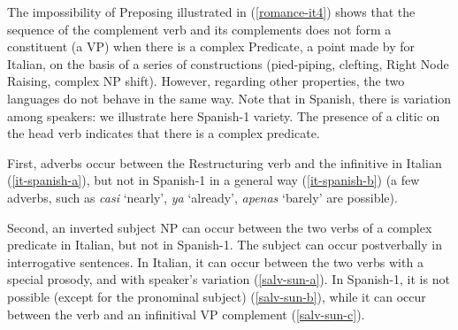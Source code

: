 \documentclass[output=paper]{langsci/langscibook}
\begin{document}
The impossibility of Preposing illustrated in (\ref{romance-it4}) shows that the sequence of the complement verb and its complements does not form a constituent (a VP) when there is a complex Predicate, a point made by \cite{Rizzi1982} for Italian, on the basis of a series of constructions (pied-piping, clefting, Right Node Raising, complex NP shift). However, regarding other properties, the two languages do not behave in the same way. Note that in Spanish, there is variation among speakers: we illustrate here Spanish-1 variety. The presence of a clitic on the head verb indicates that there is a complex predicate. 


First, adverbs occur between the Restructuring verb and the infinitive in Italian (\ref{it-spanish-a}), but not in Spanish-1 in a general way (\ref{it-spanish-b}) (a few adverbs, such as \textit{casi} `nearly', \textit{ya} `already', \textit{apenas} `barely' are possible). 


\begin{exe}
	\ex \label{it-spanish}
	
	\begin{xlist}
		
		\label{it-spanish-a}
		
		  \label{it-spanish-b}
		
		 \label{it-spanish-c}
		
		
	\end{xlist}
	
\end{exe}



Second, an inverted subject NP can occur between the two verbs of a complex predicate in Italian, but not in Spanish-1. The subject can occur postverbally in interrogative sentences. In Italian, it can occur between the two verbs with a special prosody, and with speaker's variation \citep{Salvi1980} (\ref{salv-sun-a}). In Spanish-1, it is not possible (except for the pronominal subject) \citep{Suner1991}  (\ref{salv-sun-b}), while it can occur between the verb and an infinitival VP complement (\ref{salv-sun-c}).


\begin{exe}
	\ex  \label{salv-sun}
	
	\begin{xlist}
		
		 \label{salv-sun-a}
		
		 \label{salv-sun-b}
		
		  \label{salv-sun-c}
		
	\end{xlist}
	
\end{exe}
\end{document}
